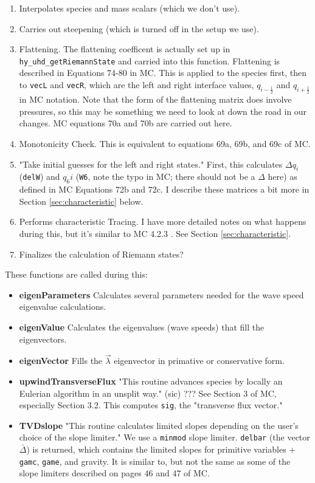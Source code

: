 \documentclass[preprint,11pt]{aastex}
\begin{document}
\begin{description}
\begin{description}
\begin{itemize}
\begin{itemize}
\begin{enumerate}
					\item Interpolates species and mass scalars (which we don't use).
					\item Carries out steepening (which is turned off in the setup we use).
					\item Flattening.  The flattening coefficent is actually set up in \verb!hy_uhd_getRiemannState! and carried into this function.  Flattening is described in Equations 74-80 in MC.  This is applied to the species first, then to \verb!vecL! and \verb!vecR!, which are the left and right interface values, $q_{i-\frac{1}{2}}$ and $q_{i+\frac{1}{2}}$ in MC notation.  Note that the form of the flattening matrix does involve pressures, so this may be something we need to look at down the road in our changes.  MC equations 70a and 70b are carried out here.
					\item Monotonicity Check.  This is equivalent to equations 69a, 69b, and 69c of MC.
					\item "Take initial guesses for the left and right states."  First, this calculates $\Delta q_i$ (\verb!delW!) and $q_6i$ (\verb!W6!, note the typo in MC; there should not be a $\Delta$ here) as defined in MC Equations 72b and 72c.  I describe these matrices a bit more in Section \ref{sec:characteristic} below.  
					\item Performs characteristic Tracing.  I have more detailed notes on what happens during this, but it's similar to MC 4.2.3 .  See Section \ref{sec:characteristic}.
					\item Finalizes the calculation of Riemann states?
				\end{enumerate}
				These functions are called during this:
				\begin{itemize}
					\item \textbf{eigenParameters} Calculates several parameters needed for the wave speed eigenvalue calculations.
					\item \textbf{eigenValue} Calculates the eigenvalues (wave speeds) that fill the eigenvectors.
					\item \textbf{eigenVector} Fills the $\vec{\lambda}$ eigenvector in primative or conservative form. 
					\item \textbf{upwindTransverseFlux} "This routine advances species by locally an Eulerian algorithm in an unsplit way." (sic)  ???  See Section 3 of MC, especially Section 3.2.  This computes \verb!sig!, the "transverse flux vector."
					\item \textbf{TVDslope} "This routine calculates limited slopes depending on the user's choice of the slope limiter."  We use a \verb!minmod! slope limiter.  \verb!delbar! (the vector $\bar{\Delta}$) is returned, which contains the limited slopes for primitive variables + \verb!gamc!, \verb!game!, and gravity.  It is similar to, but not the same as some of the slope limiters described on pages 46 and 47 of MC.

\end{itemize}
\end{itemize}
\end{itemize}
\end{description}
\end{description}
\end{document}

